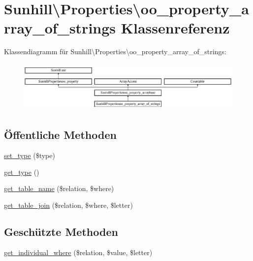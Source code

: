 \hypertarget{classSunhill_1_1Properties_1_1oo__property__array__of__strings}{}\section{Sunhill\textbackslash{}Properties\textbackslash{}oo\+\_\+property\+\_\+array\+\_\+of\+\_\+strings Klassenreferenz}
\label{classSunhill_1_1Properties_1_1oo__property__array__of__strings}
Klassendiagramm für Sunhill\textbackslash{}Properties\textbackslash{}oo\+\_\+property\+\_\+array\+\_\+of\+\_\+strings\+:\begin{figure}[H]
\begin{center}
\leavevmode
\includegraphics[height=2.548350cm]{da/d04/classSunhill_1_1Properties_1_1oo__property__array__of__strings}
\end{center}
\end{figure}
\subsection*{Öffentliche Methoden}
\begin{DoxyCompactItemize}
\item 
\hyperlink{classSunhill_1_1Properties_1_1oo__property__array__of__strings_a50f23504a315d538da4bff9b4e7d9f23}{set\+\_\+type} (\$type)
\item 
\hyperlink{classSunhill_1_1Properties_1_1oo__property__array__of__strings_acb9078458052b0c8577d03d74735a574}{get\+\_\+type} ()
\item 
\hyperlink{classSunhill_1_1Properties_1_1oo__property__array__of__strings_af9adaf3b4628169c2a1660ddf35ca5b2}{get\+\_\+table\+\_\+name} (\$relation, \$where)
\item 
\hyperlink{classSunhill_1_1Properties_1_1oo__property__array__of__strings_a9c3247697d6f1551658e22f22c949e6c}{get\+\_\+table\+\_\+join} (\$relation, \$where, \$letter)
\end{DoxyCompactItemize}
\subsection*{Geschützte Methoden}
\begin{DoxyCompactItemize}
\item 
\hyperlink{classSunhill_1_1Properties_1_1oo__property__array__of__strings_a4b6c62b2657664cea52331d41d93441b}{get\+\_\+individual\+\_\+where} (\$relation, \$value, \$letter)
\end{DoxyCompactItemize}

